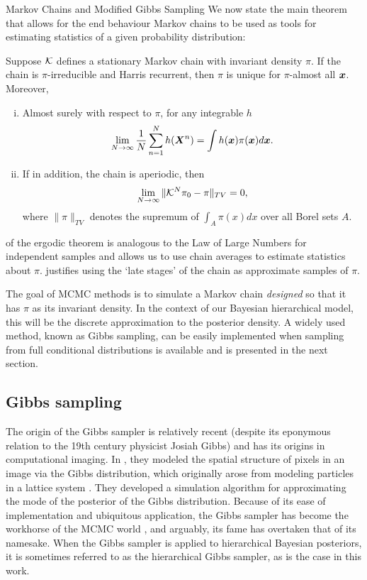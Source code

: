\begin{chapter}{Markov Chains and Modified Gibbs Sampling}
We now state the main theorem that allows for the end behaviour Markov chains to be used as tools for estimating statistics of a given probability distribution:
\begin{thm} \label{thm:ergodicTheorem}
  \citep{tierney1994markov} Suppose $\mathcal K$ defines a stationary Markov chain with invariant density $\pi$. If the chain is $\pi$-irreducible and Harris recurrent, then $\pi$ is unique for $\pi$-almost all $\mbox{\boldmath$x$}$. Moreover,
  \begin{enumerate}[(i)]
    \item Almost surely with respect to $\pi$, for any integrable $h$ \begin{equation} \lim_{N\to \infty}\frac 1N\sum_{n=1}^N h(\mbox{\boldmath$X$}^n) = \int h(\mbox{\boldmath$x$}) \pi(\mbox{\boldmath$x$}) d\mbox{\boldmath$x$}. \label{eq:ergodicStat}\end{equation}
    \item If in addition, the chain is aperiodic, then \begin{equation} \lim_{N\to \infty}\|\mathcal K^N\pi_0 - \pi\|_{TV} = 0, \label{eq:ergodicDist}\end{equation}
    where $\|\pi\|_{TV}$ denotes the supremum of $\int_A \pi(x) dx$ over all Borel sets $A$.
  \end{enumerate}
\end{thm}
 of the ergodic theorem is analogous to the Law of Large Numbers for independent samples and allows us to use chain averages to estimate statistics about $\pi$.  
 justifies using the `late stages' of the chain as approximate samples of $\pi$.

The goal of MCMC methods is to simulate a Markov chain \emph{designed} so that it has $\pi$ as its invariant density.  
In the context of our Bayesian hierarchical model, this will be the discrete approximation to the posterior density.
A widely used method, known as Gibbs sampling, can be easily implemented when sampling from full conditional distributions is available and is presented in the next section.

\subsection{Gibbs sampling}

The origin of the Gibbs sampler is relatively recent (despite its eponymous relation to the 19th century physicist Josiah Gibbs) and has its origins in computational imaging. 
In \citep{geman1984stochastic}, they modeled the spatial structure of pixels in an image via the Gibbs distribution, which originally arose from modeling particles in a lattice system \citep{ising1925beitrag}.
They developed a simulation algorithm for approximating the mode of the posterior of the Gibbs distribution.
Because of its ease of implementation and ubiquitous application, the Gibbs sampler has become the workhorse of the MCMC world \citep{robert2013monte}, and arguably, its fame has overtaken that of its namesake.
When the Gibbs sampler is applied to hierarchical Bayesian posteriors, it is sometimes referred to as the hierarchical Gibbs sampler, as is the case in this work.


\end{chapter}
